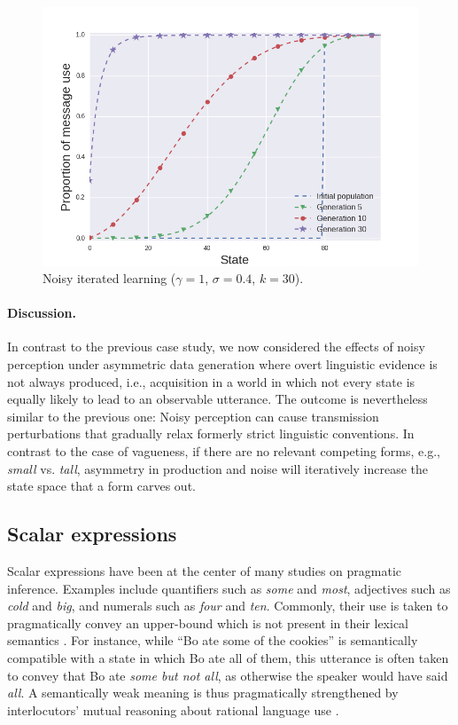 \documentclass[10pt,a4paper]{article}
\newcommand{\postparameter}{\ensuremath{\gamma}}
\begin{document}
\begin{figure}[ht]
\centering
    \includegraphics[scale=0.4]{../code/plots/deflation-sigma04.png}
  \caption{Noisy iterated learning ($\postparameter=1$, $\sigma = 0.4$, $k = 30$).}
  \label{fig:defl}
\end{figure}

\paragraph{Discussion.} In contrast to the previous case study, we now considered the effects
of noisy perception under asymmetric data generation where overt linguistic evidence is not
always produced, i.e., acquisition in a world in which not every state is equally likely to lead to an observable
utterance. The outcome is nevertheless similar to the previous one: Noisy perception can cause transmission
perturbations that gradually relax formerly strict linguistic conventions. In contrast to the
case of vagueness, if there are no relevant competing forms, e.g., {\em small} vs. {\em tall},
asymmetry in production and noise will iteratively increase the state space that a form carves
out.


\subsection{Scalar expressions}
Scalar expressions have been at the center of many studies on pragmatic inference. Examples
include quantifiers such as {\em some} and {\em most}, adjectives such as {\em cold} and {\em
  big}, and numerals such as {\em four} and {\em ten}. Commonly, their use is taken to
pragmatically convey an upper-bound which is not present in their lexical semantics
\citep{horn:1972,gazdar:1979}. For instance, while ``Bo ate some of the cookies'' is
semantically compatible with a state in which Bo ate all of them, this utterance is often taken to convey 
that Bo ate {\em some but not all}, as otherwise the speaker would have said {\em all}. A
semantically weak meaning is thus pragmatically strengthened by interlocutors' mutual reasoning
about rational language use \citep{grice:1975}. 
\end{document}
